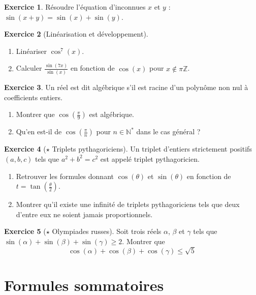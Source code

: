 \documentclass[french]{book}
\newcommand{\N}{\mathbb{N}}
\newcommand{\Z}{\mathbb{Z}}
\newcommand{\st}{^*}
\theoremstyle{definition}
\newtheorem{ex}{Exercice}[chapter]
\theoremstyle{theorem}
\theoremstyle{remark}
\begin{document}
\begin{ex}
	Résoudre l'équation d'inconnues $x$ et $y$ : $\sin(x+y)=\sin(x)+\sin(y)$.
\end{ex}

\begin{ex}[Linéarisation et développement]
	\begin{enumerate}
		\item Linéariser $\cos^7(x)$.
		\item Calculer $\displaystyle\frac{\sin(7x)}{\sin(x)}$ en fonction de $\cos(x)$ pour $x\notin\pi\Z$.
	\end{enumerate}
\end{ex}

\begin{ex}
	Un réel est dit algébrique s'il est racine d'un polynôme non nul à coefficients entiers.
	\begin{enumerate}
		\item Montrer que $\displaystyle\cos\left(\frac{\pi}{9}\right)$ est algébrique.
		\item Qu'en est-il de $\cos\left(\frac{\pi}{n}\right)$ pour $n\in\N\st$ dans le cas général ?
	\end{enumerate}
\end{ex}

\begin{ex}[$\star$ Triplets pythagoriciens]
	Un triplet d'entiers strictement positifs $(a,b,c)$ tels que $a^2+b^2=c^2$ est appelé triplet pythagoricien.
	\begin{enumerate}
		\item Retrouver les formules donnant $\cos(\theta)$ et $\sin(\theta)$ en fonction de $t=\displaystyle\tan\left(\frac{\theta}{2}\right)$.
		\item Montrer qu'il existe une infinité de triplets pythagoriciens tels que deux d'entre eux ne soient jamais proportionnels.
	\end{enumerate}
\end{ex}

\begin{ex}[$\star$ Olympiades russes]
	Soit trois réels $\alpha$, $\beta$ et $\gamma$ tels que $\sin(\alpha)+\sin(\beta)+\sin(\gamma)\geqslant 2$. Montrer que $$\cos(\alpha)+\cos(\beta)+\cos(\gamma)\leqslant\sqrt{5}$$
\end{ex}

\section{Formules sommatoires}
\end{document}
